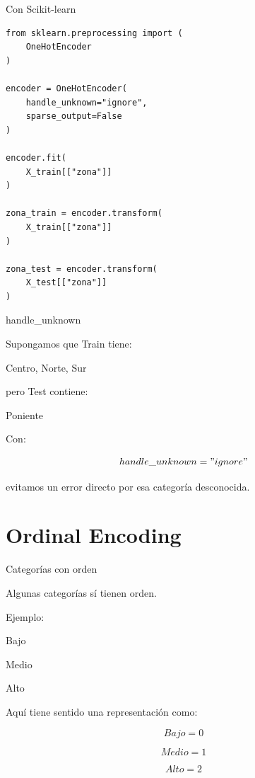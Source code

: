 \documentclass[aspectratio=169,11pt]{beamer}
\begin{document}

\begin{frame}[fragile]{Con Scikit-learn}

\begin{lstlisting}
from sklearn.preprocessing import (
    OneHotEncoder
)

encoder = OneHotEncoder(
    handle_unknown="ignore",
    sparse_output=False
)

encoder.fit(
    X_train[["zona"]]
)

zona_train = encoder.transform(
    X_train[["zona"]]
)

zona_test = encoder.transform(
    X_test[["zona"]]
)
\end{lstlisting}

\end{frame}


\begin{frame}{handle\_unknown}

Supongamos que Train tiene:

\begin{center}

Centro, Norte, Sur
\end{center}

pero Test contiene:

\begin{center}

Poniente
\end{center}

\vspace{0.4cm}

Con:

\[
handle\_unknown="ignore"
\]

evitamos un error directo por esa categoría desconocida.

\end{frame}

\section{Ordinal Encoding}

\begin{frame}{Categorías con orden}

Algunas categorías sí tienen orden.

Ejemplo:

\begin{center}

Bajo

Medio

Alto
\end{center}

Aquí tiene sentido una representación como:

\[
Bajo=0
\]

\[
Medio=1
\]

\[
Alto=2
\]

\end{frame}
\end{document}
